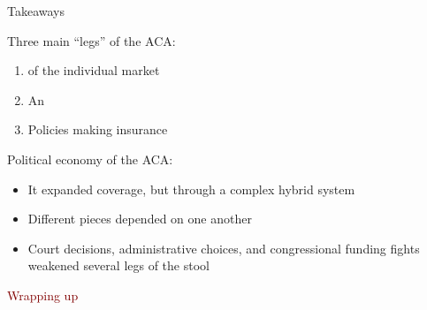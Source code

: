 \begin{frame}{Takeaways}

    Three main ``legs'' of the ACA:
    \begin{enumerate}
        \item {} of the individual market
        \item An 
        \item Policies making insurance 
    \end{enumerate}
    \vspace{3mm}

    Political economy of the ACA:
    \begin{itemize}
        \item It expanded coverage, but through a complex hybrid system
        \item Different pieces depended on one another
        \item Court decisions, administrative choices, and congressional funding fights weakened several legs of the stool
    \end{itemize}


\end{frame}
\begin{frame}{}
    \begin{center}
    \Large \textcolor{maroon}{Wrapping up}
    \end{center}
\end{frame}
